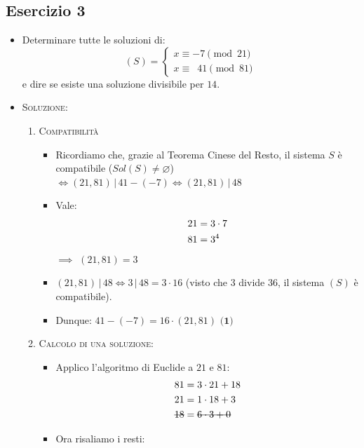 \documentclass[10pt]{article}
\begin{document}
	\subsection{Esercizio 3}
	\begin{itemize}
	\item
	Determinare tutte le soluzioni di:
	\[		
	(S) =
	\begin{cases}
	x \equiv -7 \!\!\!\pmod{21} \\
	x \equiv \,\,\, 41 \pmod{81}
	\end{cases}
	\]
	e dire se esiste una soluzione divisibile per $14$.
	\item
	\textsc{Soluzione:}
	\begin{enumerate}
	\item
	\textsc{Compatibilità}
	\begin{itemize}
	\item
	Ricordiamo che, grazie al Teorema Cinese del Resto, il sistema $S$ è compatibile ($Sol(S) \neq \varnothing$) $\Longleftrightarrow (21,81)\,|\,41-(-7) \Longleftrightarrow (21,81)\,|\, 48$
	\item
	Vale: 
	\begin{equation}
	\begin{split}
	21 &= 3 \cdot 7 \\
	81 &= 3^4 
	\notag
	\end{split}
	\end{equation} \smallskip	
	$\implies$ $(21,81) = 3$ \smallskip
	\item
	$(21,81)\,|\,48 \Longleftrightarrow 3\,|\,48 = 3 \cdot 16$ {\small (visto che $3$ divide $36$, il sistema $(S)$ è compatibile)}.
	\item
	Dunque: $41-(-7) = 16 \cdot (21,81)$ $\textbf{(1)}$\bigskip
	\end{itemize} 
	\item
	\textsc{Calcolo di una soluzione:}
	\begin{itemize}
	\item
	Applico l'algoritmo di Euclide a $21$ e $81$:
	\begin{equation}
	\begin{split}
	81 &= 3 \cdot 21 + 18 \\
	21 &= 1 \cdot 18 + 3 \\
	\hbox{\sout{$18$}} &= \hbox{\sout{$6 \cdot 3 + 0$}}
	\notag
	\end{split}
	\end{equation}
	\item
	Ora risaliamo i resti:
	\begin{equation}

\end{equation}
\end{itemize}
\end{enumerate}
\end{itemize}
\end{document}
